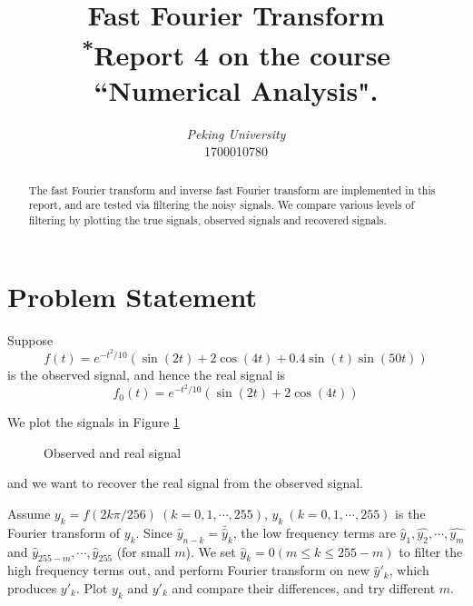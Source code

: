 \documentclass[conference,onecolumn,12pt]{IEEEtran}
\theoremstyle{definition}
\begin{document}
\title{{Fast Fourier Transform}\\
{\footnotesize \textsuperscript{*}Report 4 on the course ``Numerical Analysis".}
}

\author{
\textit{Peking University}\\
1700010780}

\maketitle
\thispagestyle{fancy} %
\lhead{} %
\chead{} %
\rhead{} %
\lfoot{} %
\cfoot{} %
\cfoot{\thepage} %
\renewcommand{\headrulewidth}{0pt} %
\renewcommand{\footrulewidth}{1pt} %
\pagestyle{fancy}
\cfoot{\thepage}

\begin{abstract}
    The fast Fourier transform and inverse fast Fourier transform are implemented in this report, and are tested via filtering the noisy signals. We compare various levels of filtering by plotting the true signals, observed signals and recovered signals.  
\end{abstract}
\tableofcontents
\section{Problem Statement}
Suppose
\begin{equation}
    f(t) = e^{-t^2/10}(\sin(2t)+2\cos(4t)+0.4\sin(t)\sin(50t))
\end{equation}
is the observed signal, and hence the real signal is
\begin{equation}
    f_0(t) = e^{-t^2/10}(\sin(2t)+2\cos(4t))
\end{equation}

We plot the signals in Figure \ref{fig:signal}
\begin{figure}[!htbp]
    \centering
    \resizebox{\textwidth}{!}{
    }
    \caption{Observed and real signal}
    \label{fig:signal}

\end{figure}
and we want to recover the real signal from the observed signal.

Assume $y_k = f(2k\pi/256)\ (k=0,1,\cdots,255)$, $\hat{y}_k\ (k=0,1,\cdots,255)$ is the Fourier transform of $y_k$. Since $\hat{y}_{n-k} = \bar{\hat{y}}_k$, the low frequency terms are $\hat{y}_1,\hat{y_2},\cdots,\hat{y_m}$ and $\hat{y}_{255-m},\cdots,\hat{y}_{255}$ (for small $m$). We set $\hat{y}_k = 0(m\leq k\leq 255-m)$ to filter the high frequency terms out, and perform Fourier transform on new $\hat{y}'_k$, which produces $y'_k$. Plot $y_k$ and $y'_k$ and compare their differences, and try different $m$.
\end{document}
